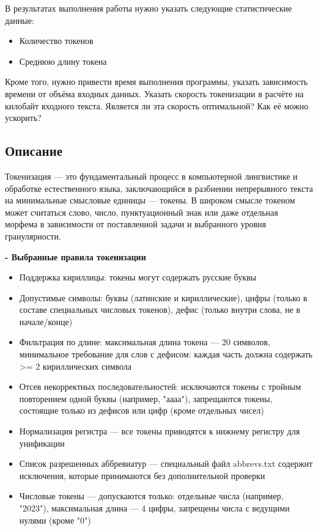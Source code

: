\documentclass[pdf, unicode, 12pt, a4paper, oneside, fleqn]{article}
\begin{document}
В результатах выполнения работы нужно указать следующие 
статистические данные: 
\begin{itemize}
    \item Количество токенов
    \item Среднюю длину токена
\end{itemize}
Кроме того, нужно привести время выполнения программы, указать 
зависимость времени от объёма входных данных. Указать скорость 
токенизации в расчёте на килобайт входного текста. Является ли эта 
скорость оптимальной? Как её можно ускорить?

\subsection*{Описание}

Токенизация — это фундаментальный процесс в компьютерной 
лингвистике и обработке естественного языка, заключающийся в разбиении 
непрерывного текста на минимальные смысловые единицы — токены. В 
широком смысле токеном может считаться слово, число, пунктуационный 
знак или даже отдельная морфема в зависимости от поставленной задачи и 
выбранного уровня гранулярности. 

\textbf{- Выбранные правила токенизации} 
\begin{itemize}
    \item Поддержка кириллицы: токены могут содержать русские буквы 
    \item Допустимые символы: буквы (латинские и кириллические), цифры 
    (только в составе специальных числовых токенов), дефис (только 
    внутри слова, не в начале/конце)
    \item Фильтрация по длине: максимальная длина токена — 20 символов, 
    минимальное требование для слов с дефисом: каждая часть должна 
    содержать >= 2 кириллических символа
    \item Отсев некорректных последовательностей: исключаются токены с 
    тройным повторением одной буквы (например, "аааа"), запрещаются 
    токены, состоящие только из дефисов или цифр (кроме отдельных 
    чисел) 
    \item Нормализация регистра — все токены приводятся к нижнему регистру для унификации 
    \item Список разрешенных аббревиатур — специальный файл abbrevs.txt 
    содержит исключения, которые принимаются без дополнительной 
    проверки 
    \item Числовые токены — допускаются только: отдельные числа (например, "2023"), максимальная длина — 4 цифры, запрещены числа с ведущими нулями (кроме "0") 
\end{itemize}
\end{document}
